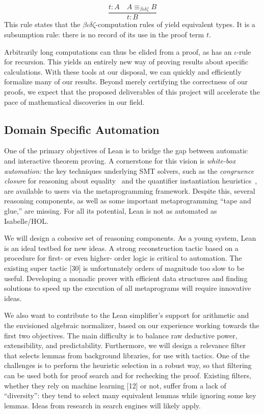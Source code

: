 \documentclass[12pt]{amsart}  %
\begin{document}
\[\frac{t : A \quad A \equiv_{\beta \iota \delta \zeta} B}{t : B}\]
This rule states that the 
$\beta \iota \delta \zeta$-computation rules
of \cic yield equivalent types. 
It is a subsumption
rule: there is no record of its use in the proof
term $t$.

Arbitrarily long computations can thus
be elided from a proof, as \cic has an $\iota$-rule for recursion.
This yields an entirely new way of proving
results about specific calculations.
With these tools at our disposal, we can quickly and efficiently formalize many
of our results.  Beyond merely certifying the correctness of our proofs, we expect 
that the proposed deliverables of this project will accelerate the pace of
mathematical discoveries in our field.





\subsection{Domain Specific Automation}
One of the primary objectives of Lean is to bridge the gap between automatic and interactive
theorem proving. A cornerstone for this vision is \emph{white-box automation:} the key techniques 
underlying SMT solvers, such as the \emph{congruence closure} for reasoning about 
equality~\cite{MR3536762} and the quantifier instantiation heuristics~\cite{MR2458080}, 
are available to users via the metaprogramming framework. Despite this, several 
reasoning components, as well as some important metaprogramming ``tape and glue,'' are missing. 
For all its potential, Lean is not as automated as Isabelle/HOL.

We will design a cohesive set of reasoning components. As a young system, Lean is an ideal
testbed for new ideas. A strong reconstruction tactic based on a procedure for first- or even higher-
order logic is critical to automation. The existing super tactic [30] is unfortunately orders of
magnitude too slow to be useful. Developing a monadic prover with efficient data structures and
finding solutions to speed up the execution of all metaprograms will require innovative ideas.

We also want to contribute to the Lean simplifier’s support for arithmetic and the envisioned
algebraic normalizer, based on our experience working towards the first two objectives. The main
difficulty is to balance raw deductive power, extensibility, and predictability. Furthermore, we will
design a relevance filter that selects lemmas from background libraries, for use with tactics. One
of the challenges is to perform the heuristic selection in a robust way, so that filtering can be used
both for proof search and for rechecking the proof. Existing filters, whether they rely on machine
learning [12] or not, suffer from a lack of “diversity”: they tend to select many equivalent lemmas
while ignoring some key lemmas. Ideas from research in search engines will likely apply.
\end{document}
